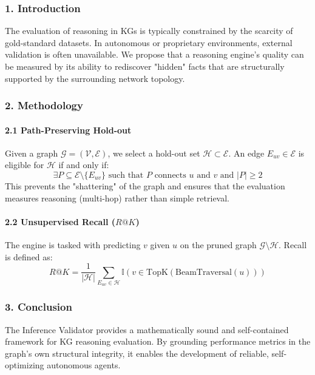 \documentclass[10pt,journal,compsoc]{IEEEtran}
\begin{document}
\subsubsection{1. Introd\-uction}
The evaluation of reasoning in KGs is typically constrained by the scarcity of gold-standard datasets. In autonomous or proprietary envir\-onments, external validation is often unavailable. We propose that a reasoning engine's quality can be measured by its ability to rediscover "hidden" facts that are struc\-turally supported by the surrounding network topology.

\subsubsection{2. Methodology}

\paragraph{2.1 Path-Preserving Hold-out}
Given a graph $\mathcal{G} = (\mathcal{V}, \mathcal{E})$, we select a hold-out set $\mathcal{H} \subset \mathcal{E}$. An edge $E_{uv} \in \mathcal{E}$ is eligible for $\mathcal{H}$ if and only if:
\begin{equation}
\exists P \subseteq \mathcal{E} \setminus \{E_{uv}\} \text{ such that } P \text{ connects } u \text{ and } v \text{ and } |P| \geq 2
\end{equation}
This prevents the "shattering" of the graph and ensures that the evaluation measures reasoning (multi-hop) rather than simple retrieval.

\paragraph{2.2 Unsupe\-rvised Recall ($R@K$)}
The engine is tasked with predicting $v$ given $u$ on the pruned graph $\mathcal{G} \setminus \mathcal{H}$. Recall is defined as:
\begin{equation}
R@K = \frac{1}{|\mathcal{H}|} \sum_{E_{uv} \in \mathcal{H}} \mathbb{I}(v \in \text{TopK}(\text{BeamTraversal}(u)))
\end{equation}

\subsubsection{3. Conclusion}
The Inference Validator provides a mathe\-matically sound and self-contained framework for KG reasoning evaluation. By grounding performance metrics in the graph's own structural integrity, it enables the development of reliable, self-optimizing autonomous agents.
\end{document}
